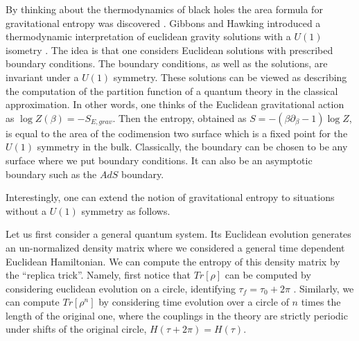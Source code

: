 By thinking about the thermodynamics of black holes the area formula
for gravitational entropy was discovered .
Gibbons and Hawking introduced a thermodynamic interpretation of
euclidean gravity solutions with a $U(1)$ isometry \GibbonsUE .
The idea is that one considers Euclidean solutions with prescribed
boundary conditions. The boundary conditions, as well as the solutions,
are invariant under a $U(1)$ symmetry.
These solutions can be viewed as
describing the computation of the partition function of a quantum theory in
the classical approximation. In other words, one thinks of the Euclidean
gravitational action as $\log Z(\beta) = - S_{E,grav}  $.
Then the entropy, obtained as $ S = - ( \beta \partial_\beta -1) \log Z $, is
equal to the area of the codimension two surface which is a fixed point for
the $U(1)$ symmetry in the bulk. Classically,
the boundary can be chosen to be any surface where we put boundary
conditions. It can also be an asymptotic boundary such as the $AdS$ boundary.

\ifig{} {}


Interestingly, one can extend the notion of gravitational entropy to situations without a $U(1)$ symmetry as follows.

Let us first consider a general quantum system. Its Euclidean evolution generates
an un-normalized
 density matrix
\eqn{}
 where we considered a general time dependent Euclidean Hamiltonian.
We can compute the entropy of this density matrix by the ``replica trick''.
Namely, first notice that $Tr[\rho] $ can be computed  by considering euclidean evolution on a circle,
identifying $\tau_f =  \tau_0 + 2 \pi$ .  Similarly, we can compute $Tr[ \rho^n] $ by considering
time evolution over a circle of $n$ times the length of the original one, where the couplings in
the theory are strictly periodic under shifts of the original circle, $H(\tau + 2\pi) = H(\tau)$.



